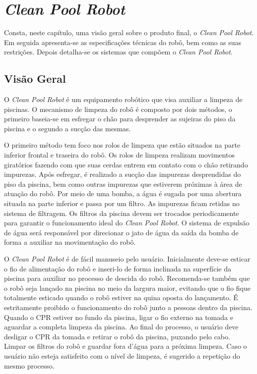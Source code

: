 \chapter{\textit{Clean Pool Robot}}
Consta, neste capítulo, uma visão geral sobre o produto final, o
\textit{Clean Pool Robot}. Em seguida apresenta-se as especificações técnicas
do robô, bem como as suas restrições. Depois detalha-se os sistemas que compõem
o \textit{Clean Pool Robot}.

\section{Visão Geral}
O \textit{Clean Pool Robot} é um equipamento robótico que visa auxiliar a limpeza de
piscinas. O mecanismo de limpeza do robô é composto por dois métodos, o
primeiro baseia-se em esfregar o chão para desprender as sujeiras do piso da
piscina e o segundo a sucção das mesmas.

O primeiro método tem foco nos rolos de limpeza que estão situados na parte
inferior frontal e traseira do robô. Os rolos de limpeza realizam movimentos
giratórios fazendo com que suas cerdas entrem em contato com o chão retirando
impurezas. Após esfregar, é realizado a sucção das impurezas desprendidas do
piso da piscina, bem como outras impurezas que estiverem próximas à área de
atuação do robô. Por meio de uma bomba, a água é sugada por uma abertura
situada na parte inferior e passa por um filtro. As impurezas ficam retidas
no sistema de filtragem. Os filtros da piscina devem ser trocados periodicamente
para garantir o funcionamento ideal do \textit{Clean Pool Robot}. O sistema de expulsão
de água será responsável por direcionar o jato de água da saída da bomba de
forma a auxiliar na movimentação do robô.

O \textit{Clean Pool Robot} é de fácil manuseio pelo usuário. Inicialmente deve-se
esticar o fio de alimentação do robô e inseri-lo de forma inclinada na
superfície da piscina para auxiliar no processo de descida do robô. Recomenda-se
também que o robô seja lançado na piscina no meio da largura maior, evitando
que o fio fique totalmente esticado quando o robô estiver na quina oposta do
lançamento. É estritamente proibido o funcionamento do robô junto a pessoas
dentro da piscina. Quando o CPR estiver no fundo da piscina, ligar o fio externo
na tomada e aguardar a completa limpeza da piscina. Ao final do processo,  o
usuário deve desligar o CPR da tomada e retirar o robô da piscina, puxando pelo
cabo. Limpar os filtros do robô e guardar fora d'água para a próxima limpeza.
Caso o usuário não esteja satisfeito com o nível de limpeza, é sugerido a
repetição do mesmo processo.

